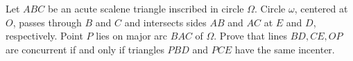 Let $ABC$ be an acute scalene triangle inscribed in circle $\Omega$. Circle $\omega$, centered at $O$, passes through $B$ and $C$ and intersects sides $AB$ and $AC$ at $E$ and $D$, respectively. Point $P$ lies on major arc $BAC$ of $\Omega$. Prove that lines $BD, CE, OP$ are concurrent if and only if triangles $PBD$ and $PCE$ have the same incenter.